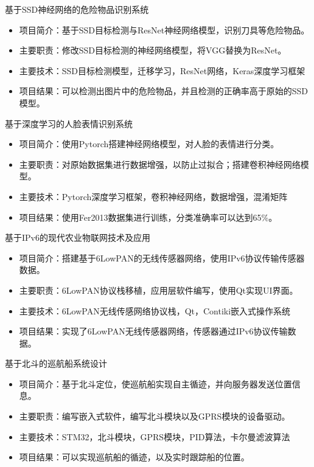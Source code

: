 \documentclass[11pt, a4paper]{moderncv}
\begin{document}
	{基于SSD神经网络的危险物品识别系统}
	{}{}{}{
		\begin{itemize}
			\item 项目简介：基于SSD目标检测与ResNet神经网络模型，识别刀具等危险物品。
			\item 主要职责：修改SSD目标检测的神经网络模型，将VGG替换为ResNet。
			\item 主要技术：SSD目标检测模型，迁移学习，ResNet网络，Keras深度学习框架
			\item 项目结果：可以检测出图片中的危险物品，并且检测的正确率高于原始的SSD模型。
	\end{itemize}}{}

	{基于深度学习的人脸表情识别系统}
	{}{}{}{
		\begin{itemize}
			\item 项目简介：使用Pytorch搭建神经网络模型，对人脸的表情进行分类。
			\item 主要职责：对原始数据集进行数据增强，以防止过拟合；搭建卷积神经网络模型。
			\item 主要技术：Pytorch深度学习框架，卷积神经网络，数据增强，混淆矩阵
			\item 项目结果：使用Fer2013数据集进行训练，分类准确率可以达到65\%。
	\end{itemize}}{}

	{基于IPv6的现代农业物联网技术及应用}
	{}{}{}{
		\begin{itemize}
			\item 项目简介：搭建基于6LowPAN的无线传感器网络，使用IPv6协议传输传感器数据。
			\item 主要职责：6LowPAN协议栈移植，应用层软件编写，使用Qt实现UI界面。
			\item 主要技术：6LowPAN无线传感网络协议栈，Qt，Contiki嵌入式操作系统
			\item 项目结果：实现了6LowPAN无线传感器网络，传感器通过IPv6协议传输数据。
	\end{itemize}}{}

	{基于北斗的巡航船系统设计}
	{}{}{}{
		\begin{itemize}
			\item 项目简介：基于北斗定位，使巡航船实现自主循迹，并向服务器发送位置信息。
			\item 主要职责：编写嵌入式软件，编写北斗模块以及GPRS模块的设备驱动。
			\item 主要技术：STM32，北斗模块，GPRS模块，PID算法，卡尔曼滤波算法
			\item 项目结果：可以实现巡航船的循迹，以及实时跟踪船的位置。
	\end{itemize}}{}
\end{document}
